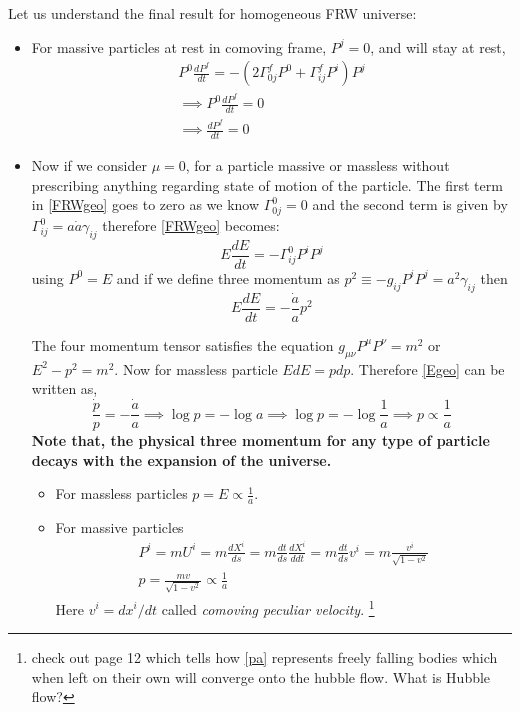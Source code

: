 \documentclass[12pt]{report}
\newcommand{\tit}[1]{\textit{#1}}
\newcommand{\fn}[1]{\footnote{#1}}
\newcommand{\de}[2]{\frac{d{#1}}{d{#2}}}
\newcommand{\ch}[2]{\Gamma^{#1}_{#2}}
\begin{document}
Let us understand the final result for homogeneous FRW universe:
\begin{itemize}
\item For massive particles at rest in comoving frame, $P^{j}=0$, and will stay at rest,
\begin{eqnarray*}
P^0 \de{P^f}{t}= - (2 \ch{f}{0 j} P^0 + \ch{f}{i j}P^{i})P^j\\
\implies  P^0 \de{P^f}{t}=0\\
\implies \de{P^f}{t}=0
\end{eqnarray*} 
\item Now if we consider $\mu=0$, for a particle massive or massless without prescribing anything regarding state of motion of the particle. The first term in \eqref{FRWgeo} goes to zero as we know $\ch{0}{0j}=0$ and the second term is given by $\ch{0}{ij}=a \dot{a} \gamma_{ij}$ therefore \eqref{FRWgeo} becomes:
\begin{equation}
E \de{E}{t}= - \ch{0}{ij} P^i P^j
\end{equation}
using $P^0=E$ and if we define three momentum as $p^2 \equiv -g_{ij}P^iP^j = a^2 \gamma_{ij}$ then
\begin{equation}\label{Egeo}
E\de{E}{t}= - \frac{\dot{a}}{a}p^2
\end{equation}


The four momentum tensor satisfies the equation $g_{\mu \nu}P^{\mu} P^{\nu}=m^2$ or $E^2-p^2=m^2$. Now for massless particle $EdE=pdp$. Therefore \eqref{Egeo} can be written as,
\begin{equation*}
\frac{\dot{p}}{p}=-\frac{\dot{a}}{a} \implies \log p= -\log a \implies \log p= -\log \frac{1}{a} \implies p \propto \frac{1}{a} 
\end{equation*}
\textbf{Note that, the physical three momentum for any type of particle decays with the expansion of the universe.}
\begin{itemize}
\item For massless particles $p=E \propto \frac{1}{a}$.
\item For massive particles 
\begin{eqnarray}
P^i=mU^i = m \de{X^i}{s}= m\de{t}{s} \de{X^i}{dt}= m \de{t}{s} v^i =m\frac{v^i}{\sqrt{1-v^2}}\\
p=\frac{mv}{\sqrt{1-v^2}}\propto \frac{1}{a} \label{pa}
\end{eqnarray}
Here $v^i=dx^i/dt$ called \tit{comoving peculiar velocity}. \fn{check out page 12 which tells how \eqref{pa} represents freely falling bodies which when left on their own will converge onto the hubble flow. What is Hubble flow?}
\end{itemize}
\end{itemize}
\end{document}
